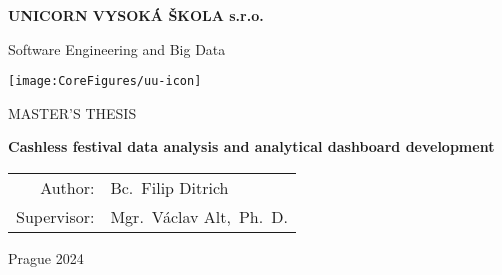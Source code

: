 \pagestyle{empty}
\begin{center}

{\bfseries\large UNICORN VYSOKÁ ŠKOLA s.r.o.}

	\vspace{5mm}

	{\Large Software Engineering and Big Data}

	\vfill
	\vspace{5mm}

	\centerline{\mbox{\texttt{[image: \\CoreFigures/uu-icon]}}}

	\vfill
	\vspace{5mm}

	{\large\MakeUppercase{Master's Thesis}}

	\vspace{15mm}

	{\LARGE\bfseries Cashless festival data analysis and analytical dashboard development}

	\vfill

	\begin{tabular}{rl}
		Author:     & Bc.~Filip Ditrich       \\
		\noalign{\vspace{2mm}}
		Supervisor: & Mgr.~Václav Alt,~Ph.~D. \\
	\end{tabular}

	\vfill

	Prague 2024

\end{center}
